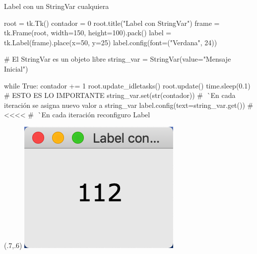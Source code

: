 \documentclass[10pt, envcountsect , spanish]{beamer}
\begin{document}
\begin{frame}[fragile]{Label con un StringVar cualquiera}
\small
\begin{pyverbatim}[][frame=single]
root = tk.Tk()
contador = 0
root.title("Label con StringVar")
frame = tk.Frame(root, width=150, height=100).pack()
label = tk.Label(frame).place(x=50, y=25)
label.config(font=("Verdana", 24))
    
# El StringVar es un objeto libre
string_var = StringVar(value="Mensaje Inicial")

while True:
    contador += 1
    root.update_idletasks()
    root.update()
    time.sleep(0.1)
    # ESTO ES LO IMPORTANTE
    string_var.set(str(contador))
    # ^^^^^ En cada iteración se asigna nuevo valor a string_var
    label.config(text=string_var.get())  # <<<<
    # ^^^^^ En cada iteración reconfiguro Label
\end{pyverbatim}

\begin{textblock*}{.25\textwidth}(.7\textwidth,.6\textheight)
\includegraphics[width=\textwidth]{fig/label-stringvar}
\end{textblock*}

\end{frame}
\end{document}
